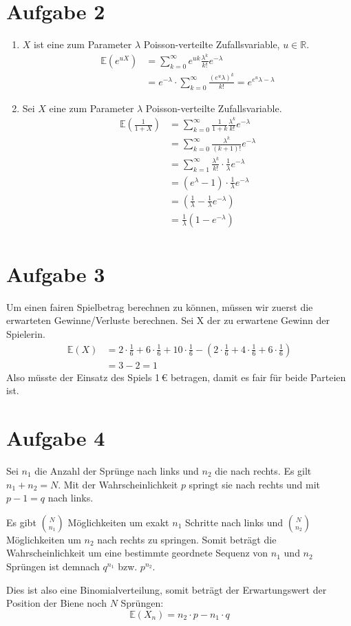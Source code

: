 \documentclass[10pt,a4paper,parskip=half]{scrartcl}
\newcommand{\E}{\mathbb{E}}
\newcommand{\R}{\mathbb{R}}
\begin{document}
\section*{Aufgabe 2}
\begin{enumerate}
\item $X$ ist eine zum Parameter $\lambda$ Poisson-verteilte Zufallsvariable, $u \in \R$.
\begin{align*}
\E(e^{uX}) &= \sum^{\infty}_{k=0} e^{uk}\frac{\lambda^k}{k!} e^{-\lambda} \\
&= e^{-\lambda}\cdot \sum_{k=0}^{\infty} \frac{(e^u\lambda)^k}{k!} = e^{e^u\lambda - \lambda}
\end{align*}
\item Sei $X$ eine zum Parameter $\lambda$ Poisson-verteilte Zufallsvariable.
\begin{align*}
\E\left(\frac{1}{1+X}\right) &= \sum^{\infty}_{k=0} \frac{1}{1+k}\frac{\lambda^k}{k!} e^{-\lambda} \\
&= \sum^{\infty}_{k=0} \frac{\lambda^k}{(k+1)!} e^{-\lambda} \\
&= \sum^{\infty}_{k=1} \frac{\lambda^{k}}{k!}\cdot \frac1\lambda e^{-\lambda} \\
&= (e^\lambda - 1) \cdot \frac1\lambda e^{-\lambda} \\
&= (\frac1\lambda  - \frac1\lambda e^{-\lambda}) \\
&= \frac{1}{\lambda}(1 - e^{-\lambda}) \\
\end{align*}
\end{enumerate}
\section*{Aufgabe 3}
Um einen fairen Spielbetrag berechnen zu können, müssen wir zuerst die erwarteten Gewinne/Verluste berechnen. Sei X der zu erwartene Gewinn der Spielerin.
\begin{align*}
\E(X) &= 2 \cdot \frac{1}{6} + 6 \cdot \frac{1}{6} + 10 \cdot \frac{1}{6}  - \left(2 \cdot \frac{1}{6} + 4 \cdot \frac{1}{6} + 6 \cdot\frac{1}{6}\right) \\
&= 3 - 2 = 1
\end{align*}
Also müsste der Einsatz des Spiels 1\,\euro{} betragen, damit es fair für beide Parteien ist.
\section*{Aufgabe 4}
Sei $n_1$ die Anzahl der Sprünge nach links und $n_2$ die nach rechts. Es gilt $n_1 + n_2 = N$.
Mit der Wahrscheinlichkeit $p$ springt sie nach rechts und mit $p - 1 = q$ nach links.

Es gibt $\binom{N}{n_1}$ Möglichkeiten um exakt $n_1$ Schritte nach links und $\binom{N}{n_2}$ Möglichkeiten um $n_2$ nach rechts zu springen.
Somit beträgt die Wahrscheinlichkeit um eine bestimmte geordnete Sequenz von $n_1$ und $n_2$ Sprüngen ist demnach $q^{n_1}$ bzw. $p^{n_2}$.

Dies ist also eine Binomialverteilung, somit beträgt der Erwartungswert der Position der Biene noch $N$ Sprüngen:
$$\E(X_n) = n_2 \cdot p - n_1 \cdot q$$
\end{document}
